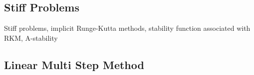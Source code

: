 \documentclass{article}
\theoremstyle{remark}
\begin{document}
\subsection{Stiff Problems}%
\label{sub:stiff_problems}
\begin{tcolorbox}
  Stiff problems, implicit Runge-Kutta methods, stability function associated with RKM, A-stability	
\end{tcolorbox}

\subsection{Linear Multi Step Method}%
\label{sub:linear_multi_step_method}

 




\end{document}
